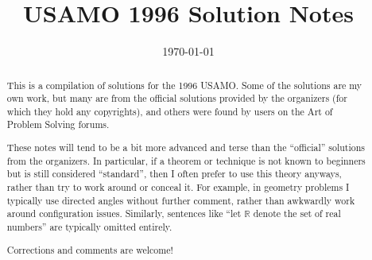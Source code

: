 \documentclass[11pt]{scrartcl}
\title{USAMO 1996 Solution Notes}
\date{\today}
\begin{document}
\maketitle

\begin{abstract}
This is a compilation of solutions
for the 1996 USAMO.
Some of the solutions are my own work,
but many are from the official solutions provided by the organizers
(for which they hold any copyrights),
and others were found by users on the Art of Problem Solving forums.

These notes will tend to be a bit more advanced and terse than the ``official''
solutions from the organizers.
In particular, if a theorem or technique is not known to beginners
but is still considered ``standard'', then I often prefer to
use this theory anyways, rather than try to work around or conceal it.
For example, in geometry problems I typically use directed angles
without further comment, rather than awkwardly work around configuration issues.
Similarly, sentences like ``let $\mathbb{R}$ denote the set of real numbers''
are typically omitted entirely.

Corrections and comments are welcome!
\end{abstract}

\tableofcontents
\newpage

\addtocounter{section}{-1}
\end{document}
